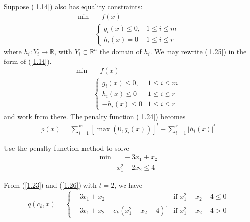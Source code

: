 Suppose (\ref{1.14}) also has equality constraints:
\begin{align}
    \min &\quad f(x) \nonumber \\
    & \left\lbrace\begin{array}{ll}
    g_i(x) \leqslant 0, & 1\leqslant i\leqslant m \\
    h_i(x) = 0 & 1\leqslant i\leqslant r 
    \end{array} \right.\label{1.25}
\end{align}
where $h_i:Y_i\to\mathbb{R}$, with $Y_i\subset \mathbb{R}^n$ the domain of $h_i$. We may rewrite (\ref{1.25}) in the form of (\ref{1.14}).
\begin{align*}
    \min &\quad f(x) \nonumber \\
    & \left\lbrace\begin{array}{rl}
    g_i(x) \leqslant 0, & 1\leqslant i\leqslant m \\
    h_i(x) \leqslant 0 & 1\leqslant i\leqslant r \\
    -h_i(x) \leqslant 0 & 1\leqslant i\leqslant r 
    \end{array} \right. 
\end{align*}
and work from there. The penalty function (\ref{1.24}) becomes
\begin{align}
    p(x) = \sum\limits_{i=1}^m \left[ \max(0, g_i(x)) \right]^t + \sum\limits_{i=1}^r \left| h_i(x) \right|^t \label{1.26}
\end{align}

\begin{example}
    Use the penalty function method to solve
    \begin{align*}
        \min &\quad -3x_1 + x_2 \\
        & x_1^2 - 2x_2 \leqslant 4
    \end{align*}
\end{example}

From (\ref{1.23}) and (\ref{1.26}) with $t = 2$, we have
\begin{align*}
    q(c_k, x) = \left\lbrace\begin{array}{ll}
         -3x_1 + x_2  & \text{if } x_1^2 - x_2 - 4\leqslant 0 \\
         -3x_1 + x_2 + c_k\left(x_1^2 - x_2 - 4\right)^2 & \text{if } x_1^2 - x_2 - 4 > 0
    \end{array} \right.
\end{align*}

